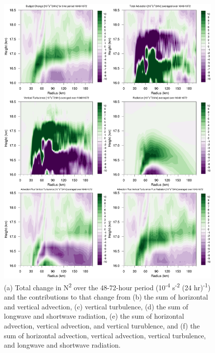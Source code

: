 \documentclass{ametsoc}
\begin{document}
\begin{figure}[ht]
\centerline{\includegraphics[width=33pc]{figures/fig07_h048-h072-budgetterms.png}}
\caption{(a) Total change in N\textsuperscript{2} over the 48-72-hour period (10\textsuperscript{-4} s\textsuperscript{-2} (24 hr)\textsuperscript{-1}) and the contributions to that change from (b) the sum of horizontal and vertical advection, (c) vertical turbulence, (d) the sum of longwave and shortwave radiation, (e) the sum of horizontal advection, vertical advection, and vertical turublence, and (f) the sum of horizontal advection, vertical advection, vertical turbulence, and longwave and shortwave radiation.}
\label{fig:stab-48-72}
\end{figure}
\end{document}
